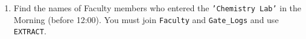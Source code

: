 \documentclass[12pt,a4paper]{article}
\begin{document}
\begin{enumerate}
\item Find the names of Faculty members who entered the \texttt{'Chemistry Lab'} in the Morning (before 12:00). You must join \texttt{Faculty} and \texttt{Gate\_Logs} and use \texttt{EXTRACT}.







\end{enumerate}
\end{document}
